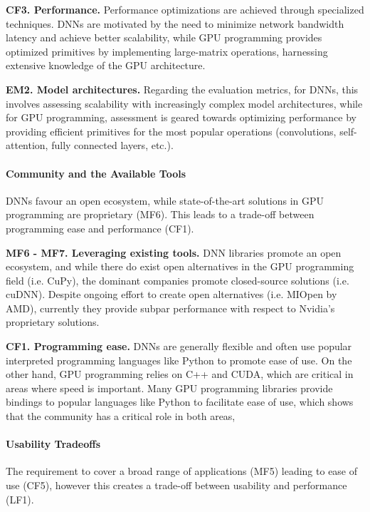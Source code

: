\textbf{CF3. Performance.}
Performance optimizations are achieved through specialized techniques. DNNs are motivated by the need to
minimize network bandwidth latency and achieve better scalability, while GPU programming provides
optimized primitives by implementing large-matrix operations, harnessing extensive knowledge of the
GPU architecture.

\textbf{EM2. Model architectures.}
Regarding the evaluation metrics, for DNNs, this involves assessing scalability with increasingly
complex model architectures, while for GPU programming, assessment is geared towards optimizing
performance by providing efficient primitives for the most popular operations (convolutions,
self-attention, fully connected layers, etc.).

\paragraph{Community and the Available Tools}
DNNs favour an open ecosystem, while state-of-the-art solutions in GPU programming are proprietary
(MF6). This leads to a trade-off between programming ease and performance (CF1).

\textbf{MF6 - MF7. Leveraging existing tools.}
DNN libraries promote an open ecosystem, and while there do exist open alternatives in the GPU programming field (i.e. CuPy),
the dominant companies promote closed-source solutions (i.e. cuDNN). Despite ongoing effort to create
open alternatives (i.e. MIOpen by AMD), currently they provide subpar performance with respect to Nvidia's
proprietary solutions.

\textbf{CF1. Programming ease.}
DNNs are generally flexible and often use popular interpreted programming languages like Python to
promote ease of use. On the other hand, GPU programming relies on C++ and CUDA, which are
critical in areas where speed is important. Many GPU programming libraries provide bindings to
popular languages like Python to facilitate ease of use, which shows that the community has a critical
role in both areas,

\paragraph{Usability Tradeoffs}
The requirement to cover a broad range of applications (MF5) leading to ease of use (CF5), however
this creates a trade-off between usability and performance (LF1).

